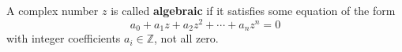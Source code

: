 A complex number $z$ is called \textbf{algebraic} if it satisfies some equation of the form
$$a_0 + a_1 z + a_2 z^2 + \cdots + a_n z^n = 0$$
with integer coefficients $a_i \in \mathbb{Z}$, not all zero.
